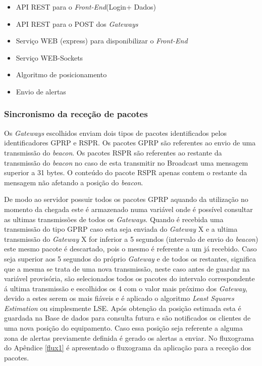 \par
\begin{itemize}
\item API REST para o \textit{Front-End}(Login+ Dados)
\item API REST para o POST dos \textit{Gateways}
\item Serviço WEB (express) para disponibilizar o \textit{Front-End}
\item Serviço WEB-Sockets 
\item Algoritmo de posicionamento
\item Envio de alertas
\end{itemize}
\par

\subsubsection{Sincronismo da receção de pacotes}
\par Os \textit{Gateways} escolhidos enviam dois tipos de pacotes identificados pelos identificadores GPRP e RSPR. Os pacotes GPRP são referentes ao envio de uma transmissão do \textit{beacon}. Os pacotes RSPR são referentes ao restante da transmissão do \textit{beacon} no caso de esta transmitir no Broadcast uma mensagem superior a 31 bytes. O conteúdo do pacote RSPR apenas contem o restante da mensagem não afetando a posição do \textit{beacon}.
\par De modo ao servidor possuir todos os pacotes GPRP aquando da utilização no momento da chegada este é armazenado numa variável onde é possível consultar as ultimas transmissões de todos os \textit{Gateways}. Quando é recebida uma transmissão do tipo GPRP caso esta seja enviada do \textit{Gateway} X e a ultima transmissão do \textit{Gateway} X for inferior a 5 segundos (intervalo de envio do \textit{beacon}) este mesmo pacote é descartado, pois o mesmo é referente a um já recebido. Caso seja superior aos 5 segundos do próprio \textit{Gateway} e de todos os restantes, significa que a mesma se trata de uma nova transmissão, neste caso antes de guardar na variável provisória, são selecionados todos os pacotes do intervalo correspondente á ultima transmissão e escolhidos os 4 com o valor mais próximo dos \textit{Gateway}, devido a estes serem os mais fiáveis e é aplicado o algoritmo \textit{Least Squares Estimation} ou simplesmente LSE. Após obtenção da posição estimada esta é guardada na Base de dados para consulta futura e são notificados os clientes de uma nova posição do equipamento. Caso essa posição seja referente a alguma zona de alertas previamente definida é gerado os alertas a enviar. No fluxograma do Apêndice \ref{flux1} é apresentado o fluxograma da aplicação para a receção dos pacotes.


